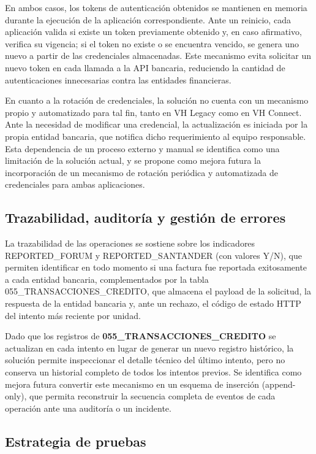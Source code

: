 En ambos casos, los tokens de autenticación obtenidos se mantienen en memoria durante la ejecución de la aplicación correspondiente. Ante un reinicio, cada aplicación valida si existe un token previamente obtenido y, en caso afirmativo, verifica su vigencia; si el token no existe o se encuentra vencido, se genera uno nuevo a partir de las credenciales almacenadas. Este mecanismo evita solicitar un nuevo token en cada llamada a la API bancaria, reduciendo la cantidad de autenticaciones innecesarias contra las entidades financieras.

En cuanto a la rotación de credenciales, la solución no cuenta con un mecanismo propio y automatizado para tal fin, tanto en VH Legacy como en VH Connect. Ante la necesidad de modificar una credencial, la actualización es iniciada por la propia entidad bancaria, que notifica dicho requerimiento al equipo responsable. Esta dependencia de un proceso externo y manual se identifica como una limitación de la solución actual, y se propone como mejora futura la incorporación de un mecanismo de rotación periódica y automatizada de credenciales para ambas aplicaciones.

\subsection{Trazabilidad, auditoría y gestión de errores}

La trazabilidad de las operaciones se sostiene sobre los indicadores REPORTED\_FORUM y REPORTED\_SANTANDER (con valores Y/N), que permiten identificar en todo momento si una factura fue reportada exitosamente a cada entidad bancaria, complementados por la tabla 055\_TRANSACCIONES\_CREDITO, que almacena el payload de la solicitud, la respuesta de la entidad bancaria y, ante un rechazo, el código de estado HTTP del intento más reciente por unidad.

Dado que los registros de \textbf{055\_TRANSACCIONES\_CREDITO} se actualizan en cada intento en lugar de generar un nuevo registro histórico, la solución permite inspeccionar el detalle técnico del último intento, pero no conserva un historial completo de todos los intentos previos. Se identifica como mejora futura convertir este mecanismo en un esquema de inserción (append-only), que permita reconstruir la secuencia completa de eventos de cada operación ante una auditoría o un incidente.

\subsection{Estrategia de pruebas}

